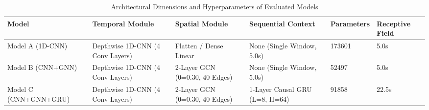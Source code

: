 \begin{table}[t]
\centering
\caption{Architectural Dimensions and Hyperparameters of Evaluated Models}
\label{tab:model_architectures}
\small
\begin{tabular}{llllll}
\toprule
Model & Temporal Module & Spatial Module & Sequential Context & Parameters & Receptive Field \\
\midrule
Model A (1D-CNN) & Depthwise 1D-CNN (4 Conv Layers) & Flatten / Dense Linear & None (Single Window, 5.0s) & 173601 & 5.0s \\
Model B (CNN+GNN) & Depthwise 1D-CNN (4 Conv Layers) & 2-Layer GCN (θ=0.30, 40 Edges) & None (Single Window, 5.0s) & 52497 & 5.0s \\
Model C (CNN+GNN+GRU) & Depthwise 1D-CNN (4 Conv Layers) & 2-Layer GCN (θ=0.30, 40 Edges) & 1-Layer Causal GRU (L=8, H=64) & 91858 & 22.5s \\
\bottomrule
\end{tabular}
\end{table}
